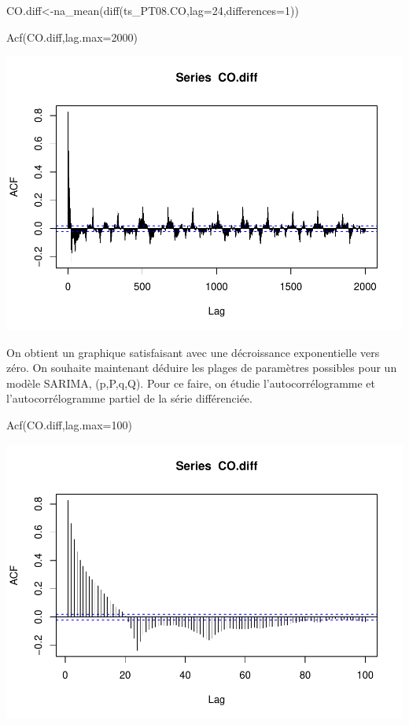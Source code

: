 \documentclass[
]{article}
\newenvironment{Shaded}{\begin{snugshade}}{\end{snugshade}}
\newcommand{\AttributeTok}[1]{\textcolor[rgb]{0.77,0.63,0.00}{#1}}
\newcommand{\DecValTok}[1]{\textcolor[rgb]{0.00,0.00,0.81}{#1}}
\newcommand{\FunctionTok}[1]{\textcolor[rgb]{0.00,0.00,0.00}{#1}}
\newcommand{\NormalTok}[1]{#1}
\newcommand{\OtherTok}[1]{\textcolor[rgb]{0.56,0.35,0.01}{#1}}
\begin{document}
\begin{Shaded}
\begin{Highlighting}[]
\NormalTok{CO.diff}\OtherTok{\textless{}{-}}\FunctionTok{na\_mean}\NormalTok{(}\FunctionTok{diff}\NormalTok{(ts\_PT08.CO,}\AttributeTok{lag=}\DecValTok{24}\NormalTok{,}\AttributeTok{differences=}\DecValTok{1}\NormalTok{))}

\FunctionTok{Acf}\NormalTok{(CO.diff,}\AttributeTok{lag.max=}\DecValTok{2000}\NormalTok{)}
\end{Highlighting}
\end{Shaded}

\includegraphics{STA202_report_files/figure-latex/unnamed-chunk-10-1.pdf}

On obtient un graphique satisfaisant avec une décroissance exponentielle
vers zéro. On souhaite maintenant déduire les plages de paramètres
possibles pour un modèle SARIMA, (p,P,q,Q). Pour ce faire, on étudie
l'autocorrélogramme et l'autocorrélogramme partiel de la série
différenciée.

\begin{Shaded}
\begin{Highlighting}[]
\FunctionTok{Acf}\NormalTok{(CO.diff,}\AttributeTok{lag.max=}\DecValTok{100}\NormalTok{)}
\end{Highlighting}
\end{Shaded}

\includegraphics{STA202_report_files/figure-latex/unnamed-chunk-11-1.pdf}
\end{document}
